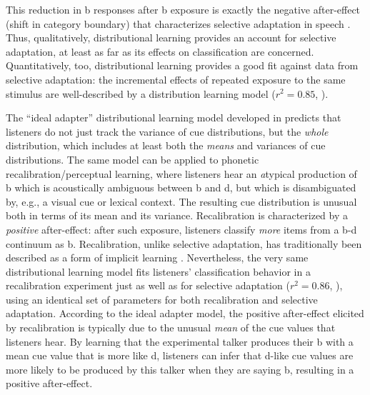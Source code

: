 This reduction in \ph b responses after \ph b exposure is exactly the negative after-effect (shift in category boundary) that characterizes selective adaptation in speech \cite{Eimas1973,Samuel1986}.  Thus, qualitatively, distributional learning provides an account for selective adaptation, at least as far as its effects on classification are concerned.  Quantitatively, too, distributional learning provides a good fit against data from selective adaptation: the incremental effects of repeated exposure to the same stimulus are well-described by a distribution learning model ($r^2=0.85$, ). 

\label{r2-whole-distribution-1}
The ``ideal adapter'' distributional learning model developed in  predicts that listeners do not just track the variance of cue distributions, but the \emph{whole} distribution, which includes at least both the \emph{means} and variances of cue distributions.  The same model can be applied to phonetic recalibration/perceptual learning, where listeners hear an {\em a}typical production of \ph b which is acoustically ambiguous between \ph b and \ph d, but which is disambiguated by, e.g., a visual cue or lexical context.  The resulting cue distribution is unusual both in terms of its mean and its variance.  Recalibration is characterized by a \emph{positive} after-effect: after such exposure, listeners classify \emph{more} items from a \ph b-\ph d continuum as \ph b.  Recalibration, unlike selective adaptation, has traditionally been described as a form of implicit learning \cite{Norris2003,Vroomen2004,Vroomen2007}.  Nevertheless, the very same distributional learning model fits listeners' classification behavior in a recalibration experiment just as well as for selective adaptation ($r^2 = 0.86$, ), using an identical set of parameters for both recalibration and selective adaptation.  According to the ideal adapter model, the positive after-effect elicited by recalibration is typically due to the unusual \emph{mean} of the cue values that listeners hear.  By learning that the experimental talker produces their \ph b with a mean cue value that is more like \ph d, listeners can infer that \ph d-like cue values are more likely to be produced by this talker when they are saying \ph b, resulting in a positive after-effect.

